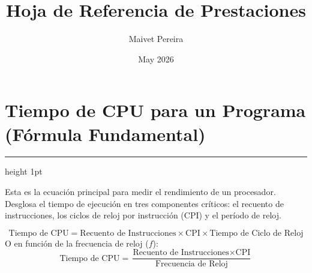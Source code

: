 \documentclass[12pt,a4paper]{article}
\title{\textbf{\color{moradovivo}Hoja de Referencia de Prestaciones}}
\author{Maivet Pereira}
\date{May 2026}
\begin{document}
\maketitle

\section{\textbf{Tiempo de CPU para un Programa (Fórmula Fundamental)}}
{\color{moradovivo}\hrule height 1pt} \vspace{0.3cm}
Esta es la ecuación principal para medir el rendimiento de un procesador. Desglosa el tiempo de ejecución en tres componentes críticos: el recuento de instrucciones, los ciclos de reloj por instrucción (CPI) y el período de reloj.

\begin{tcolorbox}
\[
\text{Tiempo de CPU} = \text{Recuento de Instrucciones} \times \text{CPI} \times \text{Tiempo de Ciclo de Reloj}
\]
O en función de la frecuencia de reloj ($f$):
\[
\text{Tiempo de CPU} = \frac{\text{Recuento de Instrucciones} \times \text{CPI}}{\text{Frecuencia de Reloj}}
\]
\end{tcolorbox}
\end{document}
